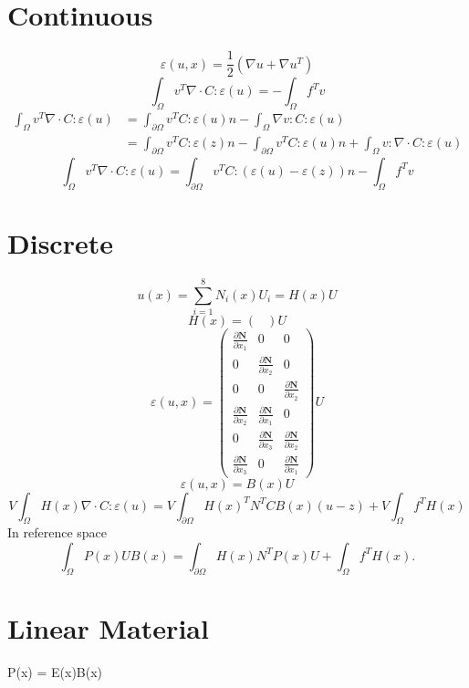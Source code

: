 \documentclass{article}
\begin{document}
\section{Continuous}
	\[\varepsilon(u,x) = \frac{1}{2}(\nabla u + \nabla u^T)\]
	\[\int_{\Omega} v^T\nabla\cdot C:\varepsilon(u) = -\int_{\Omega}f^Tv\]
	\begin{align}
	\int_{\Omega} v^T\nabla\cdot C:\varepsilon(u) &= \int_{\partial \Omega} v^TC:\varepsilon(u)n- \int_{\Omega} \nabla v:C:\varepsilon(u) \\
	&= \int_{\partial \Omega} v^TC:\varepsilon(z)n - \int_{\partial \Omega} v^TC:\varepsilon(u)n + \int_{\Omega} v:\nabla\cdot C:\varepsilon(u)
	\end{align}
	\[\int_{\Omega} v^T\nabla\cdot C:\varepsilon(u) =  \int_{\partial \Omega} v^TC:(\varepsilon(u)-\varepsilon(z))n - \int_{\Omega}f^Tv\]
	
\section{Discrete}
	\[u(x)=\sum_{i=1}^{8}N_i(x)U_i = H(x)U\]
	\[H(x) = \begin{pmatrix}
	
	\end{pmatrix}U\]
	\[\varepsilon(u,x) = \begin{pmatrix}
	  \frac{\partial \mathbf{N}}{\partial x_1} & 0 & 0\\
	  0 & \frac{\partial \mathbf{N}}{\partial x_2} & 0\\
	  0 & 0 & \frac{\partial \mathbf{N}}{\partial x_2}\\
 	  \frac{\partial \mathbf{N}}{\partial x_2} & \frac{\partial \mathbf{N}}{\partial x_1} & 0\\
  	  0 & \frac{\partial \mathbf{N}}{\partial x_3} & \frac{\partial \mathbf{N}}{\partial x_2}\\
  	  \frac{\partial \mathbf{N}}{\partial x_3} & 0 & \frac{\partial \mathbf{N}}{\partial x_1}
	\end{pmatrix}U\]
	\[\varepsilon(u,x) = B(x)U\]
	\[V\int_{\Omega}H(x) \nabla\cdot C:\varepsilon(u) =  V\int_{\partial \Omega} H(x)^TN^TCB(x)(u-z) + V\int_{\Omega}f^TH(x)\]
	In reference space
	\[
	\int_{\Omega}P(x)UB(x) = \int_{\partial\Omega}H(x)N^TP(x)U + \int_{\Omega}f^TH(x).
	\]
\section{Linear Material}
	P(x) = E(x)B(x)
\end{document}
